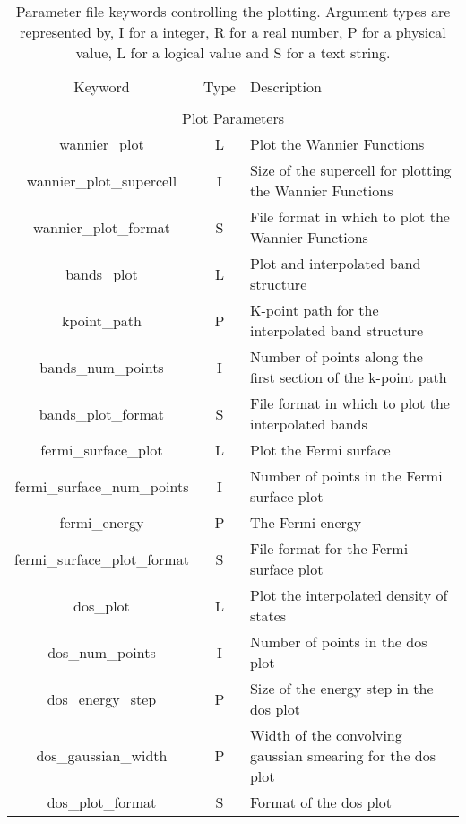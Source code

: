 \begin{table}
\begin{center}
\begin{tabular}{|c|c|p{6cm}|}
\hline
Keyword & Type & Description \\
        &      &             \\
\hline\hline
\multicolumn{3}{|c|}{Plot Parameters} \\
\hline
{\sc wannier\_plot }   & L & Plot the Wannier Functions \\
{\sc wannier\_plot\_supercell }   & I & Size of the supercell for
plotting the Wannier Functions \\
{\sc wannier\_plot\_format }   & S & File format in which to plot the
Wannier Functions \\
{\sc bands\_plot }   & L & Plot and interpolated band structure \\
{\sc kpoint\_path }   & P & K-point path for the interpolated band structure  \\
{\sc bands\_num\_points }   & I & Number of points along the first
section of the k-point path \\
{\sc bands\_plot\_format }   & S & File format in which to plot the
interpolated bands \\
{\sc fermi\_surface\_plot }   & L & Plot the Fermi surface \\
{\sc fermi\_surface\_num\_points }   & I & Number of points in the Fermi
surface plot\\
{\sc fermi\_energy }   & P & The Fermi energy \\
{\sc fermi\_surface\_plot\_format }   & S & File format for the Fermi
surface plot \\
{\sc dos\_plot }   & L & Plot the interpolated density of states \\
{\sc dos\_num\_points }   & I & Number of points in the dos plot \\
{\sc dos\_energy\_step }   & P & Size of the energy step in the dos plot \\
{\sc dos\_gaussian\_width }   & P & Width of the convolving gaussian
smearing for the dos plot \\
{\sc dos\_plot\_format }   & S & Format of the dos plot \\
\hline
\end{tabular}
\caption[Parameter file keywords controlling plotting.]
{Parameter file keywords controlling the  plotting.  Argument types
are represented by, I for a integer, R for a real number, P for a
physical value, L for a logical value and S for a text string.}
\label{parameter_keywords6}
\end{center}
\end{table}

